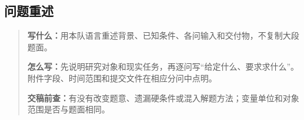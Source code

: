 \subsection{问题重述}
\begin{quote}\small
\noindent\textbf{\color{inkblue}写什么：}用本队语言重述背景、已知条件、各问输入和交付物，不复制大段题面。\par
\noindent\textbf{\color{inkblue}怎么写：}先说明研究对象和现实任务，再逐问写“给定什么、要求求什么”。附件字段、时间范围和提交文件在相应分问中点明。\par
\noindent\textbf{\color{inkblue}交稿前查：}有没有改变题意、遗漏硬条件或混入解题方法；变量单位和对象范围是否与题面相同。
\end{quote}

